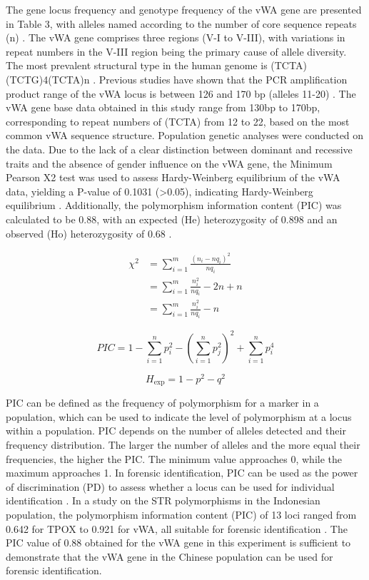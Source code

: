\documentclass[a4paper,10pt]{article}
\begin{document}
\begin{multicols}{2}
The gene locus frequency and genotype frequency of the vWA gene are presented in Table 3, with alleles named according to the number of core sequence repeats (n) \cite{van2015forensic}. The vWA gene comprises three regions (V-I to V-III), with variations in repeat numbers in the V-III region being the primary cause of allele diversity. The most prevalent structural type in the human genome is (TCTA)(TCTG)4(TCTA)n \cite{minaguchi2000structural}. Previous studies have shown that the PCR amplification product range of the vWA locus is between 126 and 170 bp (alleles 11-20) \cite{cp1992further}. The vWA gene base data obtained in this study range from 130bp to 170bp, corresponding to repeat numbers of (TCTA) from 12 to 22, based on the most common vWA sequence structure. Population genetic analyses were conducted on the data. Due to the lack of a clear distinction between dominant and recessive traits and the absence of gender influence on the vWA gene, the Minimum Pearson X2 test was used to assess Hardy-Weinberg equilibrium of the vWA data, yielding a P-value of 0.1031 (\textgreater0.05), indicating Hardy-Weinberg equilibrium \cite{harris2017unbiased}. Additionally, the polymorphism information content (PIC) was calculated to be 0.88, with an expected (He) heterozygosity of 0.898 and an observed (Ho) heterozygosity of 0.68 \cite{serrote2020determining}.


\begin{equation}\begin{aligned} \chi^2&=\sum_{i=1}^m\frac{(n_i-nq_i)^2}{nq_i}\\&=\sum_{i=1}^m\frac{n_i^2}{nq_i}-2n+n\\&=\sum_{i=1}^m\frac{n_i^2}{nq_i}-n \end{aligned}\end{equation}

\begin{equation}PIC=1-\sum_{i=1}^np_i^2-\left(\sum_{i=1}^np_j^2\right)^2+\sum_{i=1}^np_i^4\end{equation}

\begin{equation}H_{\exp}=1-p^2-q^2\end{equation}


PIC can be defined as the frequency of polymorphism for a marker in a population, which can be used to indicate the level of polymorphism at a locus within a population\cite{botstein1980construction}. PIC depends on the number of alleles detected and their frequency distribution. The larger the number of alleles and the more equal their frequencies, the higher the PIC. The minimum value approaches 0, while the maximum approaches 1. In forensic identification, PIC can be used as the power of discrimination (PD) to assess whether a locus can be used for individual identification \cite{bhinder2018se33}. In a study on the STR polymorphisms in the Indonesian population, the polymorphism information content (PIC) of 13 loci ranged from 0.642 for TPOX to 0.921 for vWA, all suitable for forensic identification \cite{manela2023dna}. The PIC value of 0.88 obtained for the vWA gene in this experiment is sufficient to demonstrate that the vWA gene in the Chinese population can be used for forensic identification.


\end{multicols}
\end{document}
